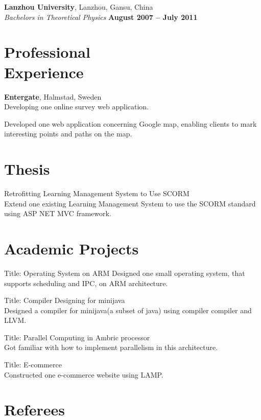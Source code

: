\documentclass[margin,line]{resume}
\begin{document}
\begin{resume}
		\textbf{Lanzhou University}, Lanzhou, Gansu, China \vspace{2mm}\\\vspace{1mm}%
		\textsl{Bachelors in Theoretical Physics} \hfill \textbf{ August 2007 -- July 2011}\vspace{-3mm}\\\vspace{-1mm}%

	\section{\mysidestyle Professional\\Experience}
		\textbf{Entergate}, Halmstad, Sweden \vspace{2mm}\\\vspace{1mm}%
		Developing one online survey web application.

		Developed one web application concerning Google map, enabling clients to mark interesting points and paths on the map.

	\section{\mysidestyle Thesis}
		Retrofitting Learning Management System to Use SCORM \\
		Extend one existing Learning Management System to use the SCORM standard using ASP NET MVC framework.

	\section{\mysidestyle Academic Projects}
		Title: Operating System on ARM
		Designed one small operating system, that supports scheduling and IPC, on ARM architecture.

		Title: Compiler Designing for minijava\\
		Designed a compiler for minijava(a subset of java) using compiler compiler and LLVM.

		Title: Parallel Computing in Ambric processor\\
		Got familiar with how to implement parallelism in this architecture.

		Title: E-commerce\\
		Constructed one e-commerce website using LAMP.

	\section{\mysidestyle Referees} 


\end{resume}
\end{document}
